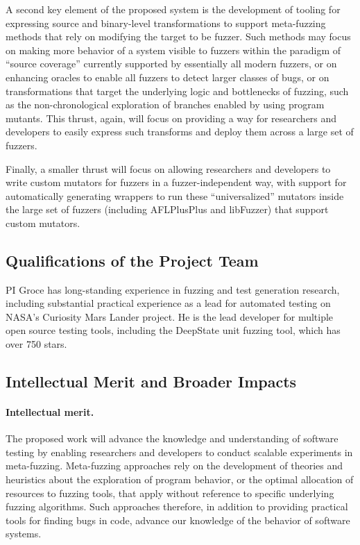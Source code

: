 A second key element of the proposed system is the development of tooling for 
expressing source and binary-level transformations to support meta-fuzzing 
methods that rely on modifying the target to be fuzzer.  Such methods may focus 
on making more behavior of a system visible to fuzzers within the paradigm of 
``source coverage'' currently supported by essentially all modern fuzzers, or 
on enhancing oracles to enable all fuzzers to detect larger classes of bugs, or 
on transformations that target the underlying logic and bottlenecks of fuzzing, 
such as the non-chronological exploration of branches enabled by using program 
mutants.  This thrust, again, will focus on providing a way for researchers and 
developers to easily express such transforms and deploy them across a large set 
of fuzzers.

Finally, a smaller thrust will focus on allowing researchers and developers to 
write custom mutators for fuzzers in a fuzzer-independent way, with support for 
automatically generating wrappers to run these ``universalized'' mutators 
inside the large set of fuzzers (including AFLPlusPlus and libFuzzer) that 
support custom mutators.


\subsection{Qualifications of the Project Team}


PI Groce has long-standing experience in fuzzing and test generation research, 
including substantial practical experience as a lead for automated testing on 
NASA's Curiosity Mars Lander project.  He is the lead developer for multiple 
open source testing tools, including the DeepState unit fuzzing tool, which has 
over 750 stars.  

\subsection{Intellectual Merit and Broader Impacts}

\paragraph{Intellectual merit.} The proposed work will advance the
knowledge and understanding of software testing by enabling
researchers and developers to conduct scalable experiments in meta-fuzzing.  
Meta-fuzzing approaches rely on the development of theories and heuristics 
about the exploration of program behavior, or the optimal allocation of 
resources to fuzzing tools, that apply without reference to specific underlying 
fuzzing algorithms.  Such approaches therefore, in addition to providing 
practical tools for finding bugs in code, advance our knowledge of the behavior 
of software systems.

